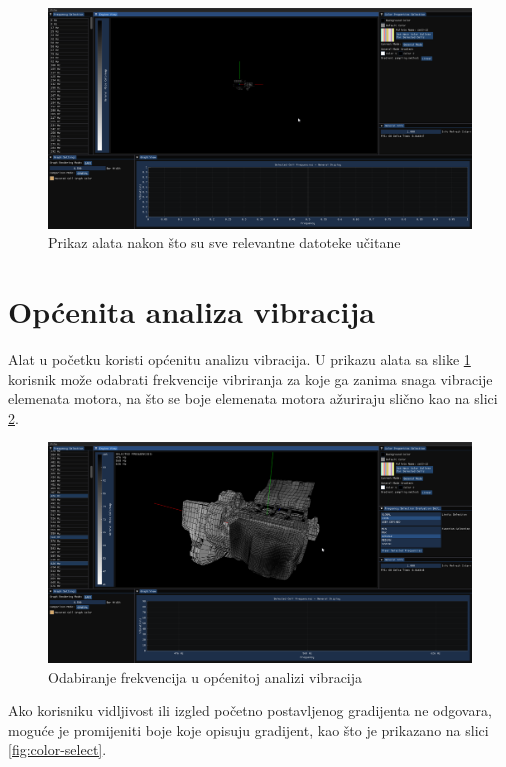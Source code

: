 \documentclass[times, utf8, diplomski]{fer}
\begin{document}
\begin{figure} [H]
	\centering
    \includegraphics[width=\textwidth]{demonstration/files_loaded_screenshot.png}
    \caption{Prikaz alata nakon što su sve relevantne datoteke učitane}
    \label{fig:loaded-files-tool}
\end{figure}

\section{Općenita analiza vibracija}

Alat u početku koristi općenitu analizu vibracija. U prikazu alata sa slike \ref{fig:loaded-files-tool} korisnik može odabrati frekvencije vibriranja za koje ga zanima snaga vibracije elemenata motora, na što se boje elemenata motora ažuriraju slično kao na slici \ref{fig:selected-frq}.

\begin{figure} [H]
	\centering
    \includegraphics[width=\textwidth]{demonstration/selected_frq.png}
    \caption{Odabiranje frekvencija u općenitoj analizi vibracija}
    \label{fig:selected-frq}
\end{figure}

Ako korisniku vidljivost ili izgled početno postavljenog gradijenta ne odgovara, moguće je promijeniti boje koje opisuju gradijent, kao što je prikazano na slici \ref{fig:color-select}.
\end{document}
